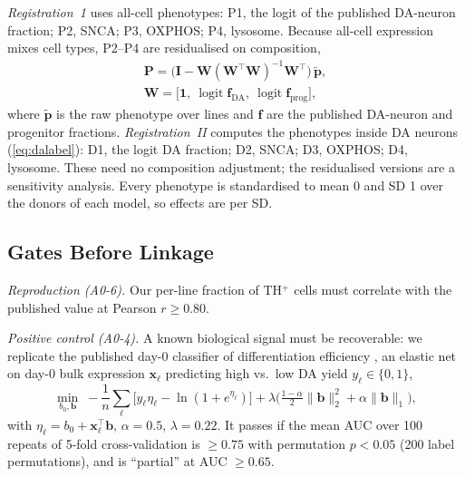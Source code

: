 \emph{Registration~1} uses all-cell phenotypes: P1, the logit of the published DA-neuron fraction;
P2, SNCA; P3, OXPHOS; P4, lysosome. Because all-cell expression mixes cell types, P2--P4 are
residualised on composition,
\begin{gather}
\mathbf{P} = \big(\mathbf{I} - \mathbf{W}(\mathbf{W}^\top\mathbf{W})^{-1}\mathbf{W}^\top\big)\,\tilde{\mathbf{p}},
\label{eq:resid}\\
\mathbf{W} = \big[\mathbf{1},\ \operatorname{logit}\mathbf{f}_{\mathrm{DA}},\ \operatorname{logit}\mathbf{f}_{\mathrm{prog}}\big],
\nonumber
\end{gather}
where $\tilde{\mathbf{p}}$ is the raw phenotype over lines and $\mathbf{f}$ are the published
DA-neuron and progenitor fractions. \emph{Registration~II} computes the phenotypes inside DA neurons
(\ref{eq:dalabel}): D1, the logit DA fraction; D2, SNCA; D3, OXPHOS; D4, lysosome. These need no
composition adjustment; the residualised versions are a sensitivity analysis. Every phenotype is
standardised to mean 0 and SD 1 over the donors of each model, so effects are per SD.

\subsection{\textbf{Gates Before Linkage}}\label{sec:prelink}
\emph{Reproduction (A0-6).} Our per-line fraction of TH$^+$ cells must correlate with the published
value at Pearson $r \ge 0.80$.

\emph{Positive control (A0-4).} A known biological signal must be recoverable: we replicate the
published day-0 classifier of differentiation efficiency \cite{bressan2023foundin}, an elastic net
on day-0 bulk expression $\mathbf{x}_\ell$ predicting high vs.\ low DA yield $y_\ell \in \{0,1\}$,
\begin{equation}
\min_{b_0,\mathbf{b}}\; -\frac{1}{n}\sum_\ell \big[y_\ell \eta_\ell - \ln(1 + e^{\eta_\ell})\big]
+ \lambda\Big(\tfrac{1-\alpha}{2}\|\mathbf{b}\|_2^2 + \alpha\|\mathbf{b}\|_1\Big),
\label{eq:enet}
\end{equation}
with $\eta_\ell = b_0 + \mathbf{x}_\ell^\top\mathbf{b}$, $\alpha = 0.5$, $\lambda = 0.22$. It passes
if the mean AUC over 100 repeats of 5-fold cross-validation is $\ge 0.75$ with permutation
$p < 0.05$ (200 label permutations), and is ``partial'' at AUC $\ge 0.65$.

